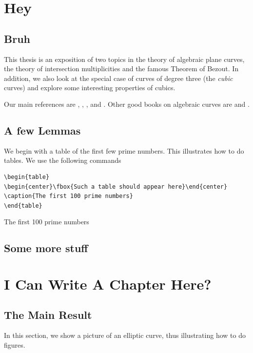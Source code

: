 
\chapter{Hey}
\section{Bruh}
This thesis is an exposition of two topics in the theory of 
algebraic plane curves, the theory of intersection multiplicities 
and the famous Theorem of Bezout.  In addition, we also look at
the special case of curves of degree three (the \emph{cubic}
curves) and explore some interesting properties of cubics.


Our main references are \cite{ST}, \cite{bix}, \cite{fulton}, 
and \cite{gibson}.  Other good books on algebraic curves are
\cite{kirwan} and \cite{walker}.

\section{A few Lemmas}
We begin with a table of the first few prime numbers.
This illustrates how to do tables.  We use the following commands

\begin{verbatim}
\begin{table}
\begin{center}\fbox{Such a table should appear here}\end{center}
\caption{The first 100 prime numbers}
\end{table}
\end{verbatim}

\begin{table}
\begin{center}\end{center}
\caption{The first 100 prime numbers}
\end{table}

\section{Some more stuff}

\chapter{I Can Write A Chapter Here?}
\section{The Main Result}
In this section, we show a picture of an elliptic curve,
thus illustrating how to do figures.

